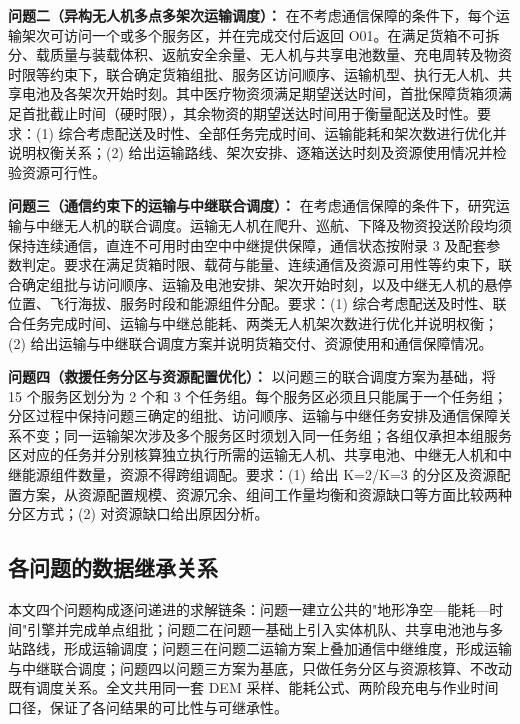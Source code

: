 \textbf{问题二（异构无人机多点多架次运输调度）：} 在不考虑通信保障的条件下，每个运输架次可访问一个或多个服务区，并在完成交付后返回 O01。在满足货箱不可拆分、载质量与装载体积、返航安全余量、无人机与共享电池数量、充电周转及物资时限等约束下，联合确定货箱组批、服务区访问顺序、运输机型、执行无人机、共享电池及各架次开始时刻。其中医疗物资须满足期望送达时间，首批保障货箱须满足首批截止时间（硬时限），其余物资的期望送达时间用于衡量配送及时性。要求：(1) 综合考虑配送及时性、全部任务完成时间、运输能耗和架次数进行优化并说明权衡关系；(2) 给出运输路线、架次安排、逐箱送达时刻及资源使用情况并检验资源可行性。

\textbf{问题三（通信约束下的运输与中继联合调度）：} 在考虑通信保障的条件下，研究运输与中继无人机的联合调度。运输无人机在爬升、巡航、下降及物资投送阶段均须保持连续通信，直连不可用时由空中中继提供保障，通信状态按附录 3 及配套参数判定。要求在满足货箱时限、载荷与能量、连续通信及资源可用性等约束下，联合确定组批与访问顺序、运输及电池安排、架次开始时刻，以及中继无人机的悬停位置、飞行海拔、服务时段和能源组件分配。要求：(1) 综合考虑配送及时性、联合任务完成时间、运输与中继总能耗、两类无人机架次数进行优化并说明权衡；(2) 给出运输与中继联合调度方案并说明货箱交付、资源使用和通信保障情况。

\textbf{问题四（救援任务分区与资源配置优化）：} 以问题三的联合调度方案为基础，将 15 个服务区划分为 2 个和 3 个任务组。每个服务区必须且只能属于一个任务组；分区过程中保持问题三确定的组批、访问顺序、运输与中继任务安排及通信保障关系不变；同一运输架次涉及多个服务区时须划入同一任务组；各组仅承担本组服务区对应的任务并分别核算独立执行所需的运输无人机、共享电池、中继无人机和中继能源组件数量，资源不得跨组调配。要求：(1) 给出 K=2/K=3 的分区及资源配置方案，从资源配置规模、资源冗余、组间工作量均衡和资源缺口等方面比较两种分区方式；(2) 对资源缺口给出原因分析。

\subsection{各问题的数据继承关系}

本文四个问题构成逐问递进的求解链条：问题一建立公共的"地形净空—能耗—时间"引擎并完成单点组批；问题二在问题一基础上引入实体机队、共享电池池与多站路线，形成运输调度；问题三在问题二运输方案上叠加通信中继维度，形成运输与中继联合调度；问题四以问题三方案为基底，只做任务分区与资源核算、不改动既有调度关系。全文共用同一套 DEM 采样、能耗公式、两阶段充电与作业时间口径，保证了各问结果的可比性与可继承性。
